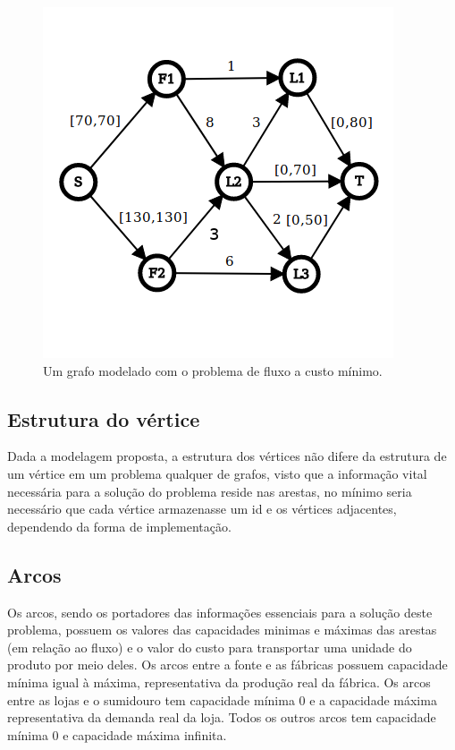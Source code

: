 \documentclass[12pt, a4]{article}
\begin{document}
\begin{figure}[H]
  \includegraphics[width=\linewidth]{grafo.png}
  \caption{Um grafo modelado com o problema de fluxo a custo mínimo.}
  \label{fig:modeled-graph}
\end{figure}

\subsection{Estrutura do vértice}
\label{subsec:vertex-structure}

Dada a modelagem proposta, a estrutura dos vértices não difere da estrutura de
um vértice em um problema qualquer de grafos, visto que a informação vital
necessária para a solução do problema reside nas arestas, no mínimo seria
necessário que cada vértice armazenasse um id e os vértices adjacentes,
dependendo da forma de implementação.

\subsection{Arcos}
\label{subsec:arches}

Os arcos, sendo os portadores das informações essenciais para a solução deste
problema, possuem os valores das capacidades minimas e máximas das arestas (em
relação ao fluxo) e o valor do custo para transportar uma unidade do produto por
meio deles. Os arcos entre a fonte e as fábricas possuem capacidade mínima igual
à máxima, representativa da produção real da fábrica. Os arcos entre as lojas e
o sumidouro tem capacidade mínima 0 e a capacidade máxima representativa da
demanda real da loja. Todos os outros arcos tem capacidade mínima 0 e capacidade
máxima infinita.
\end{document}
